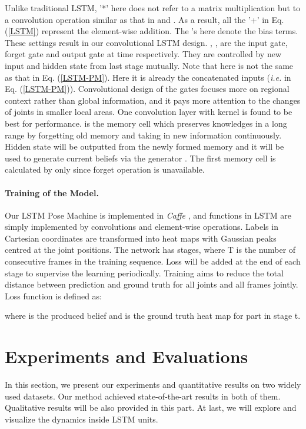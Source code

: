 \documentclass[10pt,twocolumn,letterpaper]{article}
\begin{document}
Unlike traditional LSTM, '*' here does not refer to a matrix multiplication but to a convolution operation similar as that in \cite{shi15convLSTM} and \cite{Li16convLSTMAtten}. As a result, all the '+' in Eq. (\ref{LSTM}) represent the element-wise addition. The 's here denote the bias terms. These settings result in our convolutional LSTM design. , ,  are the input gate, forget gate and output gate at time  respectively. They are controlled by new input  and hidden state from last stage  mutually. Note that  here is not the same as that in Eq. (\ref{LSTM-PM}). Here it is already the concatenated inputs (\textit{i.e.}  in Eq. (\ref{LSTM-PM})).  Convolutional design of the gates focuses more on regional context rather than global information, and it pays more attention to the changes of joints in smaller local areas. One convolution layer with  kernel is found to be best for performance.  is the memory cell which preserves knowledges in a long range by forgetting old memory and taking in new information continuously. Hidden state  will be outputted from the newly formed memory and it will be used to generate current beliefs via the generator . The first memory cell  is calculated by  only since forget operation is unavailable. 


\vspace{-5mm}
\paragraph{Training of the Model.} Our LSTM Pose Machine is implemented in \textit{Caffe} \cite{jia14caffe}, and functions in LSTM are simply implemented by convolutions and element-wise operations. Labels in 
Cartesian coordinates are transformed into heat maps with Gaussian peaks centred at the joint positions. The network has  stages, where T is the number of consecutive frames in the training sequence. Loss will be added at the end of each stage to supervise the learning periodically. Training aims to reduce the total  distance between prediction and ground truth for all joints and all frames jointly. Loss function is defined as:



where  is the produced belief and  is the ground truth heat map for part  in stage t.

\section{Experiments and Evaluations}
In this section, we present our experiments and quantitative results on two widely used datasets. Our method achieved state-of-the-art results in both of them. Qualitative results will be also provided in this part. At last, we will explore and visualize the dynamics inside LSTM units.
\end{document}
